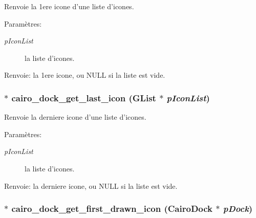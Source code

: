 Renvoie la 1ere icone d'une liste d'icones. \begin{Desc}
\item[Paramètres:]
\begin{description}
\item[{\em pIconList}]la liste d'icones. \end{description}
\end{Desc}
\begin{Desc}
\item[Renvoie:]la 1ere icone, ou NULL si la liste est vide. \end{Desc}
\subsubsection{$\ast$ cairo\_\-dock\_\-get\_\-last\_\-icon (GList $\ast$ {\em pIconList})}\label{cairo-dock-icons_8h_dbfc665a5e83340a487626894db56333}


Renvoie la derniere icone d'une liste d'icones. \begin{Desc}
\item[Paramètres:]
\begin{description}
\item[{\em pIconList}]la liste d'icones. \end{description}
\end{Desc}
\begin{Desc}
\item[Renvoie:]la derniere icone, ou NULL si la liste est vide. \end{Desc}
\subsubsection{$\ast$ cairo\_\-dock\_\-get\_\-first\_\-drawn\_\-icon ({\bf CairoDock} $\ast$ {\em pDock})}\label{cairo-dock-icons_8h_6c95bef22b883b260f1ff3537c7fdc44}


